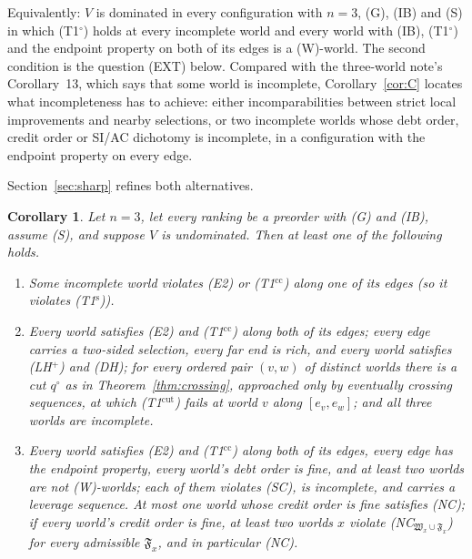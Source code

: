 \documentclass[11pt]{article}
\newtheorem{corollary}[theorem]{Corollary}
\theoremstyle{definition}\newtheorem{definition}[theorem]{Definition}
\theoremstyle{remark}\newtheorem{remark}[theorem]{Remark}
\newcommand{\To}{\textup{(T1$^\circ$)}}
\newcommand{\Ts}{\textup{(T1$^{\mathrm s}$)}}
\newcommand{\Tcc}{\textup{(T1$^{\mathrm{cc}}$)}}
\newcommand{\Tcut}{\textup{(T1$^{\mathrm{cut}}$)}}
\begin{document}
Equivalently: $V$ is dominated in every configuration with $n=3$, (G), (IB)
and (S) in which \To{} holds at every incomplete world and every world with
(IB), \To{} and the endpoint property on both of its edges is a (W)-world.
The second condition is the question (EXT) below. Compared with the
three-world note's Corollary~13, which says that some world is incomplete,
Corollary~\ref{cor:C} locates what incompleteness has to achieve: either
incomparabilities between strict local improvements and nearby selections,
or two incomplete worlds whose debt order, credit order or SI/AC dichotomy
is incomplete, in a configuration with the endpoint property on every edge.

Section~\ref{sec:sharp} refines both alternatives.

\begin{corollary}\label{cor:refined}
Let $n=3$, let every ranking be a preorder with (G) and (IB), assume (S),
and suppose $V$ is undominated. Then at least one of the following holds.
\begin{enumerate}[label=(R-\alph*),leftmargin=*,itemsep=2pt]
\item[(R-a1)] Some incomplete world violates (E2) or \Tcc{} along one of
its edges (so it violates \Ts).
\item[(R-a2$''$)] Every world satisfies (E2) and \Tcc{} along both of its
edges; every edge carries a two-sided selection, every far end is rich, and
every world satisfies (LH$^+$) and (DH); for every ordered pair $(v,w)$ of
distinct worlds there is a cut $q^\circ$ as in Theorem~\ref{thm:crossing},
approached only by eventually crossing sequences, at which \Tcut{} fails at
world $v$ along $[e_v,e_w]$; and all three worlds are incomplete.
\item[(R-b$'$)] Every world satisfies (E2) and \Tcc{} along both of its
edges, every edge has the endpoint property, every world's debt order is
fine, and at least two worlds are not (W)-worlds; each of them violates
(SC), is incomplete, and carries a leverage sequence. At most one world
whose credit order is fine satisfies (NC); if every world's credit order is
fine, at least two worlds $x$ violate (NC$_{\mathfrak W_x\cup\mathfrak
F_x}$) for every admissible $\mathfrak F_x$, and in particular (NC).
\end{enumerate}
\end{corollary}
\end{document}
